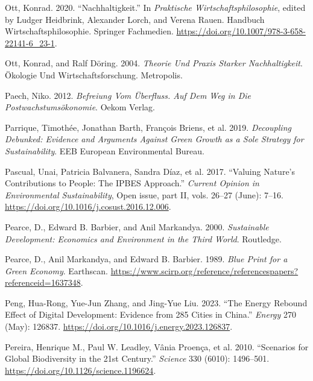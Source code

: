 \documentclass[
  a4paper,
  DIV=11,
  numbers=noendperiod,
  oneside,
  openany]{scrreprt}
\newlength{\cslhangindent}
\newenvironment{CSLReferences}[2] %
 {\begin{list}{}{%
  \setlength{\itemindent}{0pt}
  \setlength{\leftmargin}{0pt}
  \setlength{\parsep}{0pt}
  \ifodd #1
   \setlength{\leftmargin}{\cslhangindent}
   \setlength{\itemindent}{-1\cslhangindent}
  \fi
  \setlength{\itemsep}{#2\baselineskip}}}
 {\end{list}}
\begin{document}
\begin{CSLReferences}{1}{1}
Ott, Konrad. 2020. {``{Nachhaltigkeit}.''} In \emph{{Praktische
Wirtschaftsphilosophie}}, edited by Ludger Heidbrink, Alexander Lorch,
and Verena Rauen. {Handbuch Wirtschaftsphilosophie}. Springer
Fachmedien. \url{https://doi.org/10.1007/978-3-658-22141-6_23-1}.

Ott, Konrad, and Ralf Döring. 2004. \emph{Theorie Und {Praxis} Starker
{Nachhaltigkeit}}. {Ö}kologie Und {Wirtschaftsforschung}. Metropolis.

Paech, Niko. 2012. \emph{Befreiung Vom {{Ü}berfluss}. {Auf} Dem {Weg} in
Die {Postwachstums{ö}konomie}}. Oekom Verlag.

Parrique, Timothée, Jonathan Barth, François Briens, et al. 2019.
\emph{Decoupling Debunked: {Evidence} and Arguments Against Green Growth
as a Sole Strategy for Sustainability}. EEB European Environmental
Bureau.

{Pascual, Unai, Patricia Balvanera, Sandra Díaz, et al.} 2017.
{``Valuing Nature's Contributions to People: The {IPBES} Approach.''}
\emph{Current Opinion in Environmental Sustainability}, Open issue, part
{II}, vols. 26--27 (June): 7--16.
\url{https://doi.org/10.1016/j.cosust.2016.12.006}.

Pearce, D., Edward B. Barbier, and Anil Markandya. 2000.
\emph{Sustainable {Development}: {Economics} and {Environment} in the
{Third World}}. Routledge.

Pearce, D., Anil Markandya, and Edward B. Barbier. 1989. \emph{Blue
{Print} for a {Green} {Economy}}. Earthscan.
\url{https://www.scirp.org/reference/referencespapers?referenceid=1637348}.

Peng, Hua-Rong, Yue-Jun Zhang, and Jing-Yue Liu. 2023. {``The Energy
Rebound Effect of Digital Development: {Evidence} from 285 Cities in
{China}.''} \emph{Energy} 270 (May): 126837.
\url{https://doi.org/10.1016/j.energy.2023.126837}.

Pereira, Henrique M., Paul W. Leadley, Vânia Proença, et al. 2010.
{``Scenarios for {Global} {Biodiversity} in the 21st {Century}.''}
\emph{Science} 330 (6010): 1496--501.
\url{https://doi.org/10.1126/science.1196624}.


\end{CSLReferences}
\end{document}
